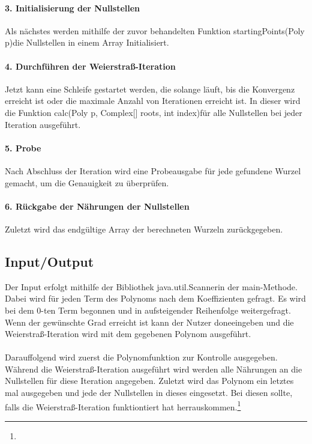 \documentclass[12pt]{article}
\begin{document}
\paragraph{3. Initialisierung der Nullstellen}
Als nächstes werden mithilfe der zuvor behandelten Funktion \glqq startingPoints(Poly p)\grqq\space die Nullstellen in einem Array Initialisiert.

\paragraph{4. Durchführen der Weierstraß-Iteration}
Jetzt kann eine Schleife gestartet werden, die solange läuft, bis die Konvergenz erreicht ist oder die maximale Anzahl von Iterationen erreicht ist. In dieser wird die Funktion \glqq calc(Poly p, Complex[] roots, int index)\grqq\space für alle Nullstellen bei jeder Iteration ausgeführt.

\paragraph{5. Probe}
Nach Abschluss der Iteration wird eine Probeausgabe für jede gefundene Wurzel gemacht, um die Genauigkeit zu überprüfen.

\paragraph{6. Rückgabe der Nährungen der Nullstellen}
Zuletzt wird das endgültige Array der berechneten Wurzeln zurückgegeben.

\subsection{Input/Output}
Der Input erfolgt mithilfe der Bibliothek \glqq java.util.Scanner\grqq\space in der \glqq main\grqq-Methode. Dabei wird für jeden Term des Polynoms nach dem Koeffizienten gefragt. Es wird bei dem $0$-ten Term begonnen und in aufsteigender Reihenfolge weitergefragt. Wenn der gewünschte Grad erreicht ist kann der Nutzer \glqq done\grqq\space eingeben und die Weierstraß-Iteration wird mit dem gegebenen Polynom ausgeführt.\\
\\
Darauffolgend wird zuerst die Polynomfunktion zur Kontrolle ausgegeben. Während die Weierstraß-Iteration ausgeführt wird werden alle Nährungen an die Nullstellen für diese Iteration angegeben. Zuletzt wird das Polynom ein letztes mal ausgegeben und jede der Nullstellen in dieses eingesetzt. Bei diesen sollte, falls die Weierstraß-Iteration funktiontiert hat \grqq\space herrauskommen.\footnote{
}
\end{document}
